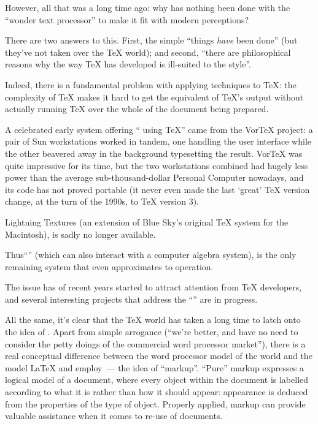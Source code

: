 However, all that was a long time ago: why has nothing been done with
the ``wonder text processor'' to make it fit with modern perceptions?

There are two answers to this.  First, the simple ``things \emph{have}
been done'' (but they've not taken over the \TeX{} world); and second,
``there are philosophical reasons why the way \TeX{} has developed is
ill-suited to the \WYSIWYG{} style''.

Indeed, there is a fundamental problem with applying \WYSIWYG{}
techniques to \TeX{}: the complexity of \TeX{} makes it hard to get
the equivalent of \TeX{}'s output without actually running \TeX{} over
the whole of the document being prepared.

A celebrated early system offering ``\WYSIWYG{} using \TeX{}'' came
from the Vor\TeX{} project: a pair of Sun workstations worked in
tandem, one handling the user interface while the other beavered away
in the background typesetting the result.  Vor\TeX{} was quite
impressive for its time, but the two workstations combined had hugely
less power than the average sub-thousand-dollar Personal Computer
nowadays, and its code has not proved portable (it never even made the
last `great' \TeX{} version change, at the turn of the 1990s, to
\TeX{} version 3).

Lightning Textures (an extension of Blue Sky's original \TeX{} system
for the Macintosh), is sadly no longer available.

Thus``'' (which can also interact
with a computer algebra system), is the only remaining \tex{} system
that even approximates to \WYSIWYG{} operation.

The issue has of recent years started to attract attention
from \TeX{} developers, and several interesting projects that address
the ``''
are in progress.

All the same, it's clear that the \TeX{} world has taken a long time
to latch onto the idea of \WYSIWYG{}.
Apart from simple arrogance (``we're better, and have no need to
consider the petty doings of the commercial word processor market''),
there is a real conceptual difference between the word processor model
of the world and the model \LaTeX{} and \CONTeXT{} employ~--- the idea of
``markup''.  ``Pure'' markup expresses a logical model of a document,
where every object within the document is labelled according to what
it is rather than how it should appear: appearance is deduced from the
properties of the type of object.  Properly applied, markup can
provide valuable assistance when it comes to re-use of documents.

